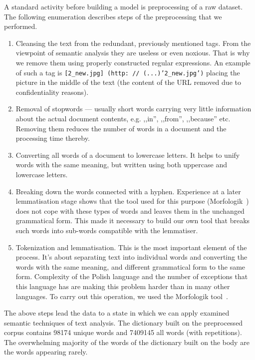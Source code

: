 \documentclass[twoside,twocolumn]{article}
\begin{document}
	A standard activity before building a model is preprocessing of a raw dataset. The following enumeration describes steps of the preprocessing that we performed.
	\begin{enumerate}
		
		\item Cleansing the text from the redundant, previously mentioned tags. From the viewpoint of semantic analysis they are useless or even noxious. That is why we remove them using properly constructed regular expressions. An example of such a tag is \texttt{[2\_new.jpg] (http: // (...)'2\_new.jpg')} placing the picture in the middle of the text (the content of the URL removed due to confidentiality reasons).
		
		\item Removal of stopwords --- usually short words carrying very little information about the actual document contents, e.g. ,,in'', ,,from'', ,,because'' etc. Removing them reduces the number of words in a document and the processing time thereby.
		
		\item Converting all words of a document to lowercase letters. It helps to unify words with the same meaning, but written using both uppercase and lowercase letters.
		
		\item Breaking down the words connected with a hyphen. Experience at a later lemmatisation stage shows that the tool used for this purpose (Morfologik~\cite{morfologik}) does not cope with these types of words and leaves them in the unchanged grammatical form. This made it necessary to build our own tool that breaks such words into sub-words compatible with the lemmatiser.
		
		\item Tokenization and lemmatisation. This is the most important element of the process. It's about separating text into individual words and converting the words with the same meaning, and different grammatical form to the same form. Complexity of the Polish language and the number of exceptions that this language has are making this problem harder than in many other languages. To carry out this operation, we used the Morfologik tool~\cite{morfologik}.
	
	\end{enumerate}
	
	The above steps lead the data to a state in which we can apply examined semantic techniques of text analysis. The dictionary built on the preprocessed corpus contains 98174 unique	words and 7409145 all words (with repetitions).	The overwhelming majority of the words of the dictionary built on the body are the words appearing rarely.
\end{document}
